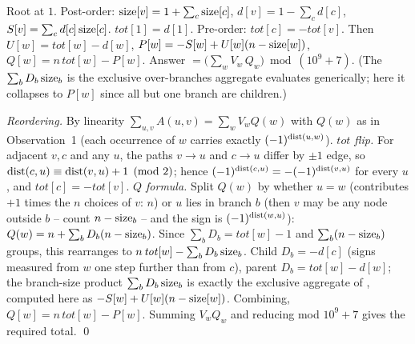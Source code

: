 Root at $1$. Post-order: $\operatorname{size}[v]=1+\sum_c\operatorname{size}[c]$, $d[v]=1-\sum_c d[c]$,
$S[v]=\sum_c d[c]\operatorname{size}[c]$. $\mathit{tot}[1]=d[1]$. Pre-order: $\mathit{tot}[c]=
-\mathit{tot}[v]$. Then $U[w]=\mathit{tot}[w]-d[w]$,
$P[w]=-S[w]+U[w](n-\operatorname{size}[w])$, $Q[w]=n\,\mathit{tot}[w]-P[w]$. Answer
$=\bigl(\sum_w V_w\,Q_w\bigr)\bmod(10^9+7)$. (The $\sum_b D_b\operatorname{size}_b$ is the
exclusive over-branches aggregate  evaluates generically;
here it collapses to $P[w]$ since all but one branch are children.)

\begin{proofbox}
\emph{Reordering.} By linearity $\sum_{u,v}A(u,v)=\sum_w V_w Q(w)$ with $Q(w)$ as
in Observation~1 (each occurrence of $w$ carries exactly $(-1)^{\operatorname{dist}(u,w)}$).
\emph{$\mathit{tot}$ flip.} For adjacent $v,c$ and any $u$, the paths $v\!\to\!u$
and $c\!\to\!u$ differ by $\pm1$ edge, so $\operatorname{dist}(c,u)\equiv \operatorname{dist}(v,u)+1\pmod 2$;
hence $(-1)^{\operatorname{dist}(c,u)}=-(-1)^{\operatorname{dist}(v,u)}$ for every $u$, and
$\mathit{tot}[c]=-\mathit{tot}[v]$. \emph{$Q$ formula.} Split $Q(w)$ by whether
$u=w$ (contributes $+1$ times the $n$ choices of $v$: $n$) or $u$ lies in branch
$b$ (then $v$ may be any node outside $b$ -- count $n-\operatorname{size}_b$ -- and the sign is
$(-1)^{\operatorname{dist}(w,u)}$): $Q(w)=n+\sum_b D_b(n-\operatorname{size}_b)$. Since $\sum_b D_b=
\mathit{tot}[w]-1$ and $\sum_b(n-\operatorname{size}_b)$ groups, this rearranges to
$n\,\mathit{tot}[w]-\sum_b D_b\operatorname{size}_b$. Child $D_b=-d[c]$ (signs measured from
$w$ one step further than from $c$), parent $D_b=\mathit{tot}[w]-d[w]$; the
branch-size product $\sum_b D_b\operatorname{size}_b$ is exactly the exclusive aggregate of
, computed here as $-S[w]+U[w](n-\operatorname{size}[w])$. Combining,
$Q[w]=n\,\mathit{tot}[w]-P[w]$. Summing $V_wQ_w$ and reducing mod $10^9+7$ gives
the required total. \qed
\end{proofbox}

